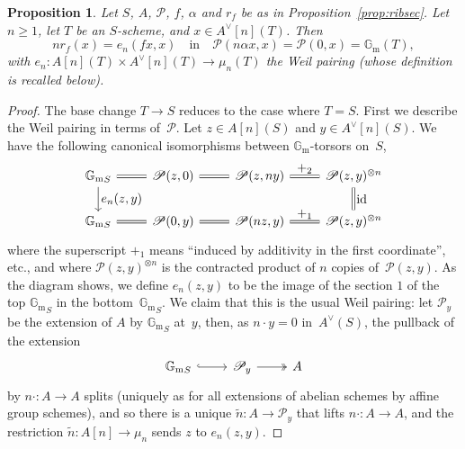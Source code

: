 \documentclass[11pt]{article}
\providecommand{\G}{}
\let\mathcal\mathscr
\let\oldvee\vee
\renewcommand{\vee}{{\scriptscriptstyle\oldvee}}
\theoremstyle{plain}
\newtheorem{Proposition}[subsection]{Proposition}
\theoremstyle{definition}
\numberwithin{equation}{subsection}
\renewcommand{\G}{\mathbb G}
\newcommand{\calP}{\mathcal{P}}
\newcommand{\Gm}{\G_{\mathrm{m}}}
\DeclareMathOperator{\id}{id}
\begin{document}
\begin{Proposition}\label{prop:ribsectors}
Let $S$, $A$, $\calP$, $f$, $\alpha$ and $r_f$ be as in
Proposition~\ref{prop:ribsec}. Let $n\geq1$, let $T$ be an
$S$-scheme, and $x\in A^\vee[n](T)$. Then
\[
nr_f(x)=e_n(fx,x)\quad \text{in}\quad \calP(n\alpha x,x)=\calP(0,x)=\Gm(T),
\]
with $e_n\colon A[n](T)\times A^\vee[n](T)\to \mu_n(T)$ the Weil
pairing (whose definition is recalled below).
\end{Proposition}
\begin{proof}
The base change $T\to S$ reduces to the case where $T=S$. First we
describe the Weil pairing in terms of~$\calP$. Let $z\in A[n](S)$ and
$y\in A^\vee[n](S)$. We have the following
canonical isomorphisms between $\Gm$-torsors on~$S$,
\[
\begin{tikzcd}
{\Gm}_S \arrow[r, equal] \arrow[d,"\textstyle{e_n(z,y)}"] & \calP(z,0) \arrow[r, equal]
& \calP(z,ny) \arrow[r,equal,"\textstyle+_2"]
& \calP(z,y) ^{\otimes n} \arrow[d,equal,"\textstyle\id"] \\
{\Gm}_S \arrow[r, equal]& \calP(0,y) \arrow[r, equal]
& \calP(nz,y) \arrow[r,equal,"\textstyle+_1"]
& \calP(z,y) ^{\otimes n}
\end{tikzcd}
\]
where the superscript $+_1$ means ``induced by additivity in the first
coordinate'', etc., and where $\calP(z,y)^{\otimes n}$ is the
contracted product of $n$ copies of~$\calP(z,y)$. As the diagram
shows, we define $e_n(z,y)$ to be the image of the section $1$ of the
top ${\Gm}_S$ in the bottom~${\Gm}_S$. We claim that this is the usual
Weil pairing: let $\calP_y$ be the extension of $A$ by ${\Gm}_S$
at~$y$, then, as $n{\cdot}y=0$ in~$A^\vee(S)$, the pullback of the
extension
\[
\begin{tikzcd}
{\Gm}_S \arrow[r, hook]
& \calP_y \arrow[r, two heads]
& A
\end{tikzcd}
\]
by $n{\cdot}\colon A\to A$ splits (uniquely as for all extensions of
abelian schemes by affine group schemes), and so
there is a unique $\tilde{n}\colon A\to \calP_y$ that
lifts $n{\cdot}\colon A\to A$, and the restriction $\tilde{n}\colon
A[n]\to\mu_n$ sends $z$ to $e_n(z,y)$.


\end{proof}
\end{document}
